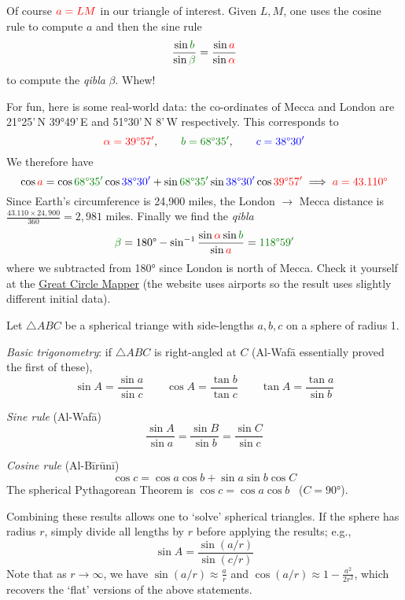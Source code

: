 Of course $\textcolor{red}{a=LM}$ in our triangle of interest. Given $L,M$, one uses the cosine rule to compute $a$ and then the sine rule
\[
	\frac{\sin \textcolor{Green}{b}}{\sin\textcolor{Green}{\beta}}=\frac{\sin \textcolor{red}{a}}{\sin\textcolor{red}{\alpha}}
\]
to compute the \emph{qibla} $\beta$. Whew!\medbreak

For fun, here is some real-world data: the co-ordinates of Mecca and London are \ang{21}25'\,N \ang{39}49'\,E and \ang{51}30'\,N 8'\,W respectively. This corresponds to
\[
	\textcolor{red}{\alpha=\ang{39}57'},\qquad \textcolor{Green}{b=\ang{68}35'},\qquad \textcolor{blue}{c=\ang{38}30'}
\]
We therefore have
\[
	\cos\textcolor{red}{a} =\cos \textcolor{Green}{\ang{68}35'}\cos \textcolor{blue}{\ang{38}30'}+\sin \textcolor{Green}{\ang{68}35'}\sin\textcolor{blue}{\ang{38}30'}\cos \textcolor{red}{\ang{39}57'} \implies \textcolor{red}{a=\ang{43.110}}
\]
Since Earth's circumference is 24,900 miles, the London $\to$ Mecca distance is $\frac{43.110\times 24,900}{360}=2,981$ miles. Finally we find the \emph{qibla}
\[
	\textcolor{Green}{\beta}=\ang{180} -\sin^{-1}\frac{\sin\textcolor{red}{\alpha}\sin\textcolor{Green}{b}}{\sin \textcolor{red}{a}}=\textcolor{Green}{\ang{118}59'}
\]
where we subtracted from \ang{180} since London is north of Mecca. Check it yourself at the \href{http://www.gcmap.com/mapui?P=LON-QCA}{Great Circle Mapper} (the website uses airports so the result uses slightly different initial data).

\goodbreak


Let $\triangle ABC$ be a spherical triange with side-lengths $a,b,c$ on a sphere of radius 1.\smallbreak

\emph{Basic trigonometry}: if $\triangle ABC$ is right-angled at $C$ (Al-Wafā essentially proved the first of these),
\[
	\sin A=\frac{\sin a}{\sin c}\qquad \cos A=\frac{\tan b}{\tan c}\qquad \tan A=\frac{\tan a}{\sin b}
\]

\emph{Sine rule} (Al-Wafā)
\[
	\frac{\sin A}{\sin a}=\frac{\sin B}{\sin b}=\frac{\sin C}{\sin c}
\]

\emph{Cosine rule} (Al-Bīrūnī)
\[
	\cos c=\cos a\cos b+\sin a\sin b\cos C
\]
The spherical Pythagorean Theorem is $\cos c=\cos a\cos b$ \ ($C=\ang{90}$).\smallbreak

Combining these results allows one to `solve' spherical triangles. If the sphere has radius $r$, simply divide all lengths by $r$ before applying the results; e.g.,
\[
	\sin A=\frac{\sin (a/r)}{\sin(c/r)}
\]
Note that as $r\to\infty$, we have $\sin(a/r)\approx \frac ar$ and $\cos(a/r)\approx 1-\frac{a^2}{2r^2}$, which recovers the `flat' versions of the above statements.


